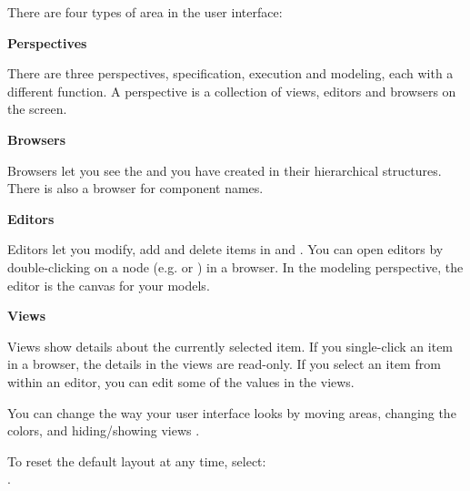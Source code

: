 
There are four types of area in the \app{} user interface:
\bigskip

\textbf{Perspectives}

There are three perspectives, specification, execution and modeling, each with a different function. A perspective is a collection of views, editors and browsers on the screen. 

\textbf{Browsers}

Browsers let you see the \gdcases{} and \gdsuites{} you have created in their hierarchical structures. There is also a browser for component names. 

\textbf{Editors}

Editors let you modify, add and delete items in \gdcases{} and \gdsuites{}. You can open editors by double-clicking on a node (e.g. \gdsuite{} or \gdcase{}) in a browser. In the modeling perspective, the editor is the canvas for your models. 


\textbf{Views}

Views show details about the currently selected item. If you single-click an item in a browser, the details in the views are read-only. If you select an item from within an editor, you can edit some of the values in the views.  

\bigskip

You can change the way your user interface looks by moving areas, changing the colors, and hiding/showing views . 

To reset the default layout at any time, select:\\
.



